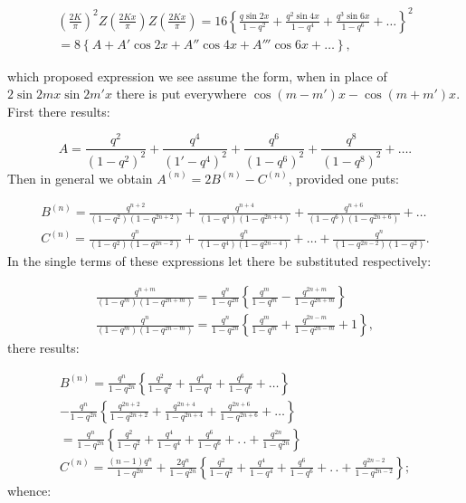 \documentclass{article}
\begin{document}
\[
\begin{gathered}
\left(\frac{2K}{\pi}\right)^{2}Z\left(\frac{2Kx}{\pi}\right)Z\left(\frac{2Kx}{\pi}\right)=16\left\{\frac{q\sin2x}{1-q^{2}}+\frac{q^{2}\sin4x}{1-q^{4}}+\frac{q^{3}\sin6x}{1-q^{6}}+\ldots\right\}^{2}\\[1ex]
=8\left\{A+A'\cos2x+A''\cos4x+A'''\cos6x+\ldots\right\},
\end{gathered}
\]

which proposed expression we see assume the form, when in place of $2\sin2mx\sin2m'x$ there is put everywhere $\cos(m-m')x-\cos(m+m')x$. First there results:

\[
A=\frac{q^{2}}{(1-q^{2})^{2}}+\frac{q^{4}}{(1'-q^{4})^{2}}+\frac{q^{6}}{(1-q^{6})^{2}}+\frac{q^{8}}{(1-q^{8})^{2}}+\ldots.
\]
Then in general we obtain $A^{(n)}=2B^{(n)}-C^{(n)}$, provided one puts:

\[
\begin{gathered}
B^{(n)}=\frac{q^{n+2}}{(1-q^{2})(1-q^{2n+2})}+\frac{q^{n+4}}{(1-q^{4})(1-q^{2n+4})}+\frac{q^{n+6}}{(1-q^{6})(1-q^{2n+6})}+\ldots\\[1.5ex]
C^{(n)}=\frac{q^{n}}{(1-q^{2})(1-q^{2n-2})}+\frac{q^{n}}{(1-q^{4})(1-q^{2n-4})}+\ldots+\frac{q^{n}}{(1-q^{2n-2})(1-q^{2})}.
\end{gathered}
\]
In the single terms of these expressions let there be substituted respectively:

\[
\begin{gathered}
\frac{q^{n+m}}{(1-q^{m})(1-q^{2n+m})}=\frac{q^{n}}{1-q^{2n}}\left\{\frac{q^{m}}{1-q^{m}}-\frac{q^{2n+m}}{1-q^{2n+m}}\right\}\\[1.5ex]
\frac{q^{n}}{(1-q^{m})(1-q^{2n-m})}=\frac{q^{n}}{1-q^{2n}}\left\{\frac{q^{m}}{1-q^{m}}+\frac{q^{2n-m}}{1-q^{2n-m}}+1\right\},
\end{gathered}
\]
there results:

\[
\begin{gathered}
B^{(n)}=\frac{q^{n}}{1-q^{2n}}\left\{\frac{q^{2}}{1-q^{2}}+\frac{q^{4}}{1-q^{4}}+\frac{q^{6}}{1-q^{6}}+\ldots\right\}\\[1.5ex]
-\frac{q^{n}}{1-q^{2n}}\left\{\frac{q^{2n+2}}{1-q^{2n+2}}+\frac{q^{2n+4}}{1-q^{2n+4}}+\frac{q^{2n+6}}{1-q^{2n+6}}+\ldots\right\}\\[1.5ex]
=\frac{q^{n}}{1-q^{2n}}\left\{\frac{q^{2}}{1-q^{2}}+\frac{q^{4}}{1-q^{4}}+\frac{q^{6}}{1-q^{6}}+.\,.+\frac{q^{2n}}{1-q^{2n}}\right\}\\[1.5ex]
C^{(n)}=\frac{(n-1)q^{n}}{1-q^{2n}}+\frac{2q^{n}}{1-q^{2n}}\left\{\frac{q^{2}}{1-q^{2}}+\frac{q^{4}}{1-q^{4}}+\frac{q^{6}}{1-q^{6}}+.\,.+\frac{q^{2n-2}}{1-q^{2n-2}}\right\};
\end{gathered}
\]
whence:
\end{document}
